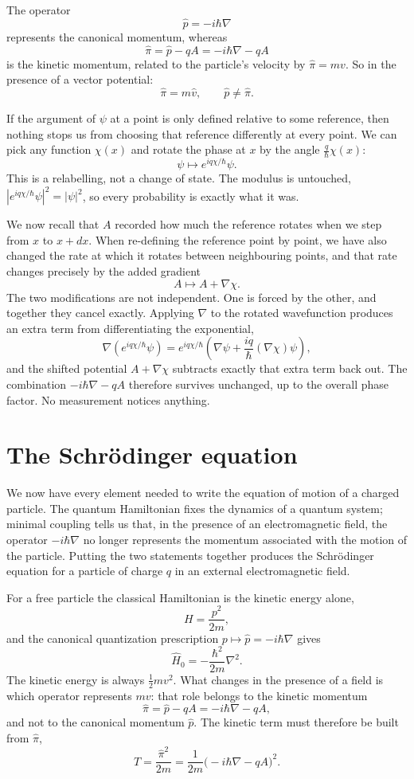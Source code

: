 The operator
\[
	\hat p = -i \hbar \nabla
\]
represents the canonical momentum, whereas
\[
	\hat \pi = \hat p - qA = - i \hbar \nabla - q A
\]
is the kinetic momentum, related to the particle's velocity by \(\hat \pi =
mv\). So in the presence of a vector potential:
\[
	\hat{\pi} = m\hat{v}, \qquad \hat{p} \neq \hat{\pi}.
\]

If the argument of \(\psi\) at a point is only defined relative to some
reference, then nothing stops us from choosing that reference differently
at every point. We can pick any function \(\chi(x)\) and rotate the phase
at \(x\) by the angle \(\frac{q}{\hbar} \chi(x)\):
\[
	\psi \longmapsto e^{iq\chi / \hbar} \psi.
\]
This is a relabelling, not a change of state. The modulus is untouched,
\(|e^{iq \chi / \hbar} \psi|^2 = |\psi|^2\), so every probability is
exactly what it was.

We now recall that \(A\) recorded how much the reference rotates when
we step from \(x\) to \(x + dx\). When re-defining the reference point by
point, we have also changed the rate at which it rotates between
neighbouring points, and that rate changes precisely by the added gradient
\[
	A \longmapsto A + \nabla \chi.
\]
The two modifications are not independent. One is forced by the other,
and together they cancel exactly. Applying \(\nabla\) to the rotated
wavefunction produces an extra term from differentiating the exponential,
\[
	\nabla \left(e^{iq \chi /\hbar}\psi \right) = e^{iq\chi/ \hbar}
	\left(\nabla \psi + \frac{iq}{\hbar}(\nabla \chi)\psi\right),
\]
and the shifted potential \(A + \nabla \chi\) subtracts exactly that extra
term back out. The combination \(-i \hbar \nabla - q A\) therefore survives
unchanged, up to the overall phase factor. No measurement notices anything.


\section{The Schrödinger equation}


We now have every element needed to write the
equation of motion of a charged particle. The quantum
Hamiltonian fixes the dynamics of a quantum system; minimal
coupling tells us that, in the presence of an
electromagnetic field, the operator \(-i \hbar \nabla\) no
longer represents the momentum associated with the motion of
the particle. Putting the two statements together produces
the Schrödinger equation for a particle of charge \(q\) in
an external electromagnetic field.

For a free particle the classical Hamiltonian is the
kinetic energy alone,
\[
	H = \frac{p^2}{2m},
\]
and the canonical quantization prescription \(p \longmapsto
\hat p = -i \hbar \nabla\) gives
\[
	\hat H_0 = - \frac{\hbar^2}{2m} \nabla^2.
\]
The kinetic energy is always \(\tfrac{1}{2}mv^2\). What changes
in the presence of a field is which operator represents
\(mv\): that role belongs to the kinetic momentum
\[
	\hat \pi = \hat p - qA = -i \hbar \nabla - qA,
\]
and not to the canonical momentum $\hat{p}$. The kinetic term must therefore be built
from $\hat{\pi}$,
\[
	\hat{T} = \frac{\hat{\pi}^{2}}{2m}
	= \frac{1}{2m}\bigl(-i\hbar\nabla - qA\bigr)^{2}.
\]

